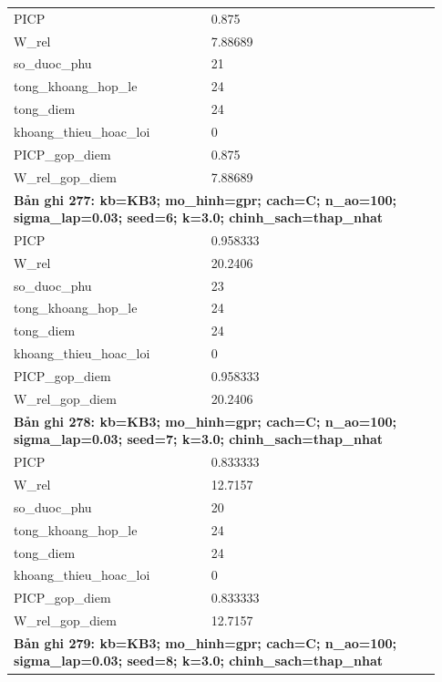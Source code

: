 \begin{longtable}{p{0.43\linewidth}p{0.50\linewidth}}
PICP & 0.875 \\
W\_\allowbreak rel & 7.88689 \\
so\_\allowbreak duoc\_\allowbreak phu & 21 \\
tong\_\allowbreak khoang\_\allowbreak hop\_\allowbreak le & 24 \\
tong\_\allowbreak diem & 24 \\
khoang\_\allowbreak thieu\_\allowbreak hoac\_\allowbreak loi & 0 \\
PICP\_\allowbreak gop\_\allowbreak diem & 0.875 \\
W\_\allowbreak rel\_\allowbreak gop\_\allowbreak diem & 7.88689 \\
\midrule
\multicolumn{2}{p{0.95\linewidth}}{\textbf{Bản ghi 277: kb=KB3; mo\_hinh=gpr; cach=C; n\_ao=100; sigma\_lap=0.03; seed=6; k=3.0; chinh\_sach=thap\_nhat}} \\
PICP & 0.958333 \\
W\_\allowbreak rel & 20.2406 \\
so\_\allowbreak duoc\_\allowbreak phu & 23 \\
tong\_\allowbreak khoang\_\allowbreak hop\_\allowbreak le & 24 \\
tong\_\allowbreak diem & 24 \\
khoang\_\allowbreak thieu\_\allowbreak hoac\_\allowbreak loi & 0 \\
PICP\_\allowbreak gop\_\allowbreak diem & 0.958333 \\
W\_\allowbreak rel\_\allowbreak gop\_\allowbreak diem & 20.2406 \\
\midrule
\multicolumn{2}{p{0.95\linewidth}}{\textbf{Bản ghi 278: kb=KB3; mo\_hinh=gpr; cach=C; n\_ao=100; sigma\_lap=0.03; seed=7; k=3.0; chinh\_sach=thap\_nhat}} \\
PICP & 0.833333 \\
W\_\allowbreak rel & 12.7157 \\
so\_\allowbreak duoc\_\allowbreak phu & 20 \\
tong\_\allowbreak khoang\_\allowbreak hop\_\allowbreak le & 24 \\
tong\_\allowbreak diem & 24 \\
khoang\_\allowbreak thieu\_\allowbreak hoac\_\allowbreak loi & 0 \\
PICP\_\allowbreak gop\_\allowbreak diem & 0.833333 \\
W\_\allowbreak rel\_\allowbreak gop\_\allowbreak diem & 12.7157 \\
\midrule
\multicolumn{2}{p{0.95\linewidth}}{\textbf{Bản ghi 279: kb=KB3; mo\_hinh=gpr; cach=C; n\_ao=100; sigma\_lap=0.03; seed=8; k=3.0; chinh\_sach=thap\_nhat}} \\

\end{longtable}
